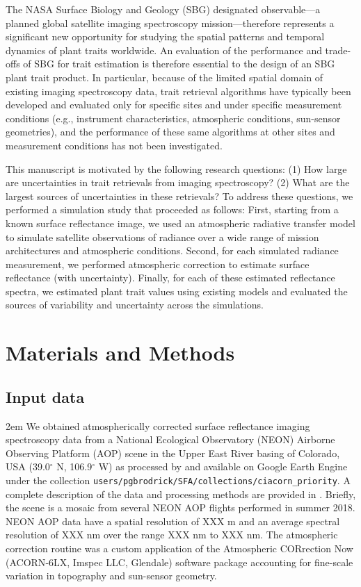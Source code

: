 \documentclass[draft]{agujournal2019}
\begin{document}
The NASA Surface Biology and Geology (SBG) designated observable—a planned global satellite imaging spectroscopy mission—therefore represents a significant new opportunity for studying the spatial patterns and temporal dynamics of plant traits worldwide.
An evaluation of the performance and trade-offs of SBG for trait estimation is therefore essential to the design of an SBG plant trait product.
In particular, because of the limited spatial domain of existing imaging spectroscopy data, trait retrieval algorithms have typically been developed and evaluated only for specific sites and under specific measurement conditions (e.g., instrument characteristics, atmospheric conditions, sun-sensor geometries), and the performance of these same algorithms at other sites and measurement conditions has not been investigated.

This manuscript is motivated by the following research questions:
(1) How large are uncertainties in trait retrievals from imaging spectroscopy?
(2) What are the largest sources of uncertainties in these retrievals?
To address these questions, we performed a simulation study that proceeded as follows:
First, starting from a known surface reflectance image, we used an atmospheric radiative transfer model to simulate satellite observations of radiance over a wide range of mission architectures and atmospheric conditions.
Second, for each simulated radiance measurement, we performed atmospheric correction to estimate surface reflectance (with uncertainty).
Finally, for each of these estimated reflectance spectra, we estimated plant trait values using existing models and evaluated the sources of variability and uncertainty across the simulations.

\section{Materials and Methods}\label{sec:methods}

\subsection{Input data}\label{subsec:input-data}

\emergencystretch 2em  %
We obtained atmospherically corrected surface reflectance imaging spectroscopy data from a National Ecological Observatory (NEON) Airborne Observing Platform (AOP) scene in the Upper East River basing of Colorado, USA (39.0$^{\circ}$ N, 106.9$^{\circ}$ W) as processed by  and available on Google Earth Engine under the collection \texttt{users/pgbrodrick/SFA/collections/ciacorn\_priority}.
A complete description of the data and processing methods are provided in .
Briefly, the scene is a mosaic from several NEON AOP flights performed in summer 2018.
NEON AOP data have a spatial resolution of XXX m and an average spectral resolution of XXX nm over the range XXX nm to XXX nm. %
The atmospheric correction routine was a custom application of the Atmospheric CORrection Now (ACORN‐6LX, Imspec LLC, Glendale) software package accounting for fine-scale variation in topography and sun-sensor geometry.
\end{document}
